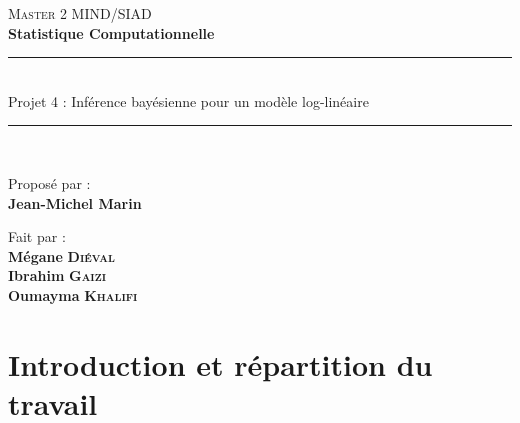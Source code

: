 \documentclass[french,12pt]{report}
\newcommand{\<}{\langle}
\renewcommand{\>}{\rangle}
\theoremstyle{definition}
\begin{document}
\begin{titlepage}
\vspace{4cm}

\center
\textsc{\LARGE Master 2 MIND/SIAD}\\
\vspace{1cm}
\textrm{\textbf{Statistique Computationnelle}}

\rule{\linewidth}{1pt}\\[0.4cm]

\huge {Projet 4 : Inférence bayésienne pour un modèle log-linéaire }
\rule{\linewidth}{1pt}\\[0.5cm]

 
 




\vspace{1cm}

\Large Proposé par : \\[0.5cm]

\LARGE \textbf{Jean-Michel Marin}\\






     




 
\vspace{1cm}

\Large Fait par : \\[0.9cm]


\LARGE \textbf{Mégane} \textsc{ \textbf{Diéval}}\\  
\vspace{0.5cm}
\LARGE \textbf{Ibrahim} \textsc{ \textbf{Gaizi}}\\
\vspace{0.5cm}
\LARGE \textbf{Oumayma} \textsc{ \textbf{Khalifi}}\\     


  

\centering




     




\end{titlepage}

\newpage
\renewcommand{\contentsname}{Table des matières}
\tableofcontents
\pagebreak
\chapter*{Introduction et répartition du travail}
\end{document}
